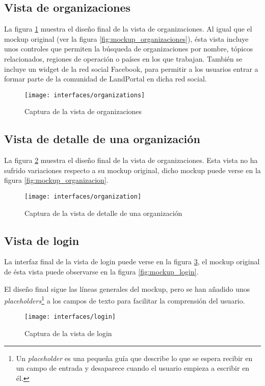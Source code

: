 \subsection{Vista de organizaciones}
La figura \ref{fig:interface_organizaciones} muestra el diseño final de la vista de organizaciones.  Al igual que el mockup original (ver la figura \ref{fig:mockup_organizaciones}), ésta vista incluye unos controles que permiten la búsqueda de organizaciones por nombre, tópicos relacionados, regiones de operación o países en los que trabajan.  También se incluye un widget de la red social Facebook, para permitir a los usuarios entrar a formar parte de la comunidad de LandPortal en dicha red social.
\begin{figure}[h]
	\centering
	\texttt{[image: interfaces/organizations]}
	\caption{Captura de la vista de organizaciones}
	\label{fig:interface_organizaciones}
\end{figure}


\subsection{Vista de detalle de una organización}
La figura \ref{fig:interface_organizacion} muestra el diseño final de la vista de organizaciones.  Esta vista no ha sufrido variaciones respecto a su mockup original, dicho mockup puede verse en la figura \ref{fig:mockup_organizacion}.
\begin{figure}[h]
	\centering
	\texttt{[image: interfaces/organization]}
	\caption{Captura de la vista de detalle de una organización}
	\label{fig:interface_organizacion}
\end{figure}


\subsection{Vista de login}
La interfaz final de la vista de login puede verse en la figura \ref{fig:interface_login},  el mockup original de ésta vista puede observarse en la figura \ref{fig:mockup_login}.  

El diseño final sigue las líneas generales del mockup, pero se han añadido unos \textit{placeholders}\footnote{Un \textit{placeholder} es una pequeña guía que describe lo que se espera recibir en un campo de entrada y desaparece cuando el usuario empieza a escribir en él.} a los campos de texto para facilitar la comprensión del usuario.
\begin{figure}[h]
	\centering
	\texttt{[image: interfaces/login]}
	\caption{Captura de la vista de login}
	\label{fig:interface_login}
\end{figure}


